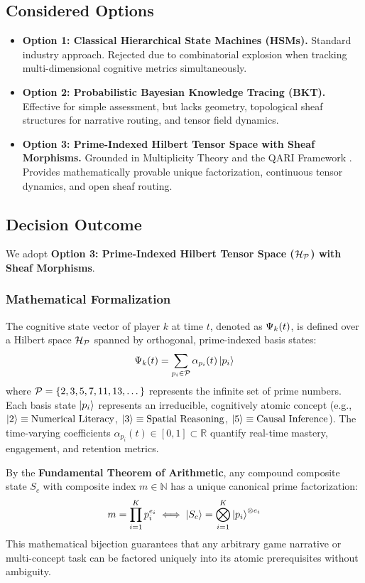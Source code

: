 \subsection{Considered Options}
\begin{itemize}
    \item \textbf{Option 1: Classical Hierarchical State Machines (HSMs).} Standard industry approach. Rejected due to combinatorial explosion when tracking multi-dimensional cognitive metrics simultaneously.
    \item \textbf{Option 2: Probabilistic Bayesian Knowledge Tracing (BKT).} Effective for simple assessment, but lacks geometry, topological sheaf structures for narrative routing, and tensor field dynamics.
    \item \textbf{Option 3: Prime-Indexed Hilbert Tensor Space with Sheaf Morphisms.} Grounded in Multiplicity Theory and the QARI Framework \cite{mourokh2024qari}. Provides mathematically provable unique factorization, continuous tensor dynamics, and open sheaf routing.
\end{itemize}

\subsection{Decision Outcome}
We adopt \textbf{Option 3: Prime-Indexed Hilbert Tensor Space ($\mathcal{H}_{\mathcal{P}}$) with Sheaf Morphisms}.

\subsubsection{Mathematical Formalization}
The cognitive state vector of player $k$ at time $t$, denoted as $\Psi_k(t)$, is defined over a Hilbert space $\mathcal{H}_{\mathcal{P}}$ spanned by orthogonal, prime-indexed basis states:
\begin{equation}
\label{eq:psi_state}
\Psi_k(t) = \sum_{p_i \in \mathcal{P}} \alpha_{p_i}(t) \ket{p_i}
\end{equation}
where $\mathcal{P} = \{2, 3, 5, 7, 11, 13, \dots\}$ represents the infinite set of prime numbers. Each basis state $\ket{p_i}$ represents an irreducible, cognitively atomic concept (e.g., $\ket{2} \equiv \text{Numerical Literacy}$, $\ket{3} \equiv \text{Spatial Reasoning}$, $\ket{5} \equiv \text{Causal Inference}$). The time-varying coefficients $\alpha_{p_i}(t) \in [0, 1] \subset \mathbb{R}$ quantify real-time mastery, engagement, and retention metrics.

By the \textbf{Fundamental Theorem of Arithmetic}, any compound composite state $S_c$ with composite index $m \in \mathbb{N}$ has a unique canonical prime factorization:
\begin{equation}
m = \prod_{i=1}^{K} p_i^{e_i} \iff \ket{S_c} = \bigotimes_{i=1}^K \ket{p_i}^{\otimes e_i}
\end{equation}
This mathematical bijection guarantees that any arbitrary game narrative or multi-concept task can be factored uniquely into its atomic prerequisites without ambiguity.

